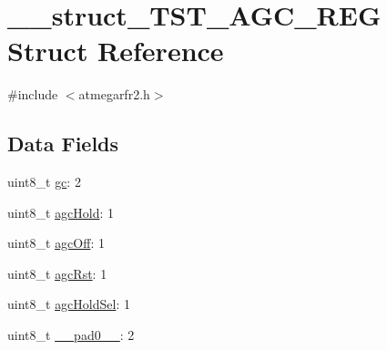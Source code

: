 \hypertarget{struct____struct___t_s_t___a_g_c___r_e_g}{\section{\-\_\-\-\_\-struct\-\_\-\-T\-S\-T\-\_\-\-A\-G\-C\-\_\-\-R\-E\-G Struct Reference}
\label{struct____struct___t_s_t___a_g_c___r_e_g}
}


{\ttfamily \#include $<$atmegarfr2.\-h$>$}

\subsection*{Data Fields}
\begin{DoxyCompactItemize}
\item 
uint8\-\_\-t \hyperlink{struct____struct___t_s_t___a_g_c___r_e_g_a5e531dbf7f64d7fa00254021ef2d68ed}{gc}\-: 2
\item 
uint8\-\_\-t \hyperlink{struct____struct___t_s_t___a_g_c___r_e_g_a31767c2b683ff487cc964be8cdb1b641}{agc\-Hold}\-: 1
\item 
uint8\-\_\-t \hyperlink{struct____struct___t_s_t___a_g_c___r_e_g_abdac0f232ebbc45fd79137819756111a}{agc\-Off}\-: 1
\item 
uint8\-\_\-t \hyperlink{struct____struct___t_s_t___a_g_c___r_e_g_a8c24b123f4c703a4c91ec94f09a02e8d}{agc\-Rst}\-: 1
\item 
uint8\-\_\-t \hyperlink{struct____struct___t_s_t___a_g_c___r_e_g_ae18fd665fd009faf704b02ddfa587aba}{agc\-Hold\-Sel}\-: 1
\item 
uint8\-\_\-t \hyperlink{struct____struct___t_s_t___a_g_c___r_e_g_aa01f9881d6ad7fa91d9ef9ed45652539}{\-\_\-\-\_\-pad0\-\_\-\-\_\-}\-: 2
\end{DoxyCompactItemize}


